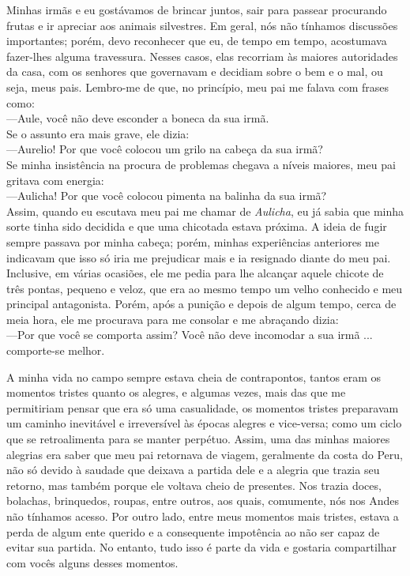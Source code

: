 Minhas irmãs e eu gostávamos de brincar juntos, sair para passear procurando frutas e ir apreciar aos animais silvestres. Em geral, nós não tínhamos discussões importantes; porém, devo reconhecer que eu, de tempo em tempo, acostumava fazer-lhes alguma travessura.
Nesses casos, elas recorriam às maiores autoridades da casa, com os senhores que governavam e decidiam sobre o bem e o mal, ou seja, meus pais. 
Lembro-me de que, no princípio, meu pai me falava com frases como:\\\indent
---Aule, você não deve esconder a boneca da sua irmã.\\\indent
Se o assunto era mais grave, ele dizia: \\\indent
---Aurelio! Por que você colocou um grilo na cabeça da sua irmã?\\\indent
Se minha insistência na procura de problemas chegava a níveis maiores, meu pai gritava com energia:\\\indent
---Aulicha! Por que você colocou pimenta na balinha da sua irmã?\\\indent
Assim, quando eu escutava meu pai me chamar de \textit{Aulicha}, eu já sabia que minha sorte tinha sido decidida e que uma chicotada estava próxima. A ideia de fugir sempre passava por minha cabeça; porém, minhas experiências anteriores me indicavam que isso só iria me prejudicar mais e ia resignado diante do meu pai. Inclusive, em várias ocasiões, ele me pedia para lhe alcançar aquele chicote de três pontas, pequeno e veloz, que era ao mesmo tempo um velho conhecido e meu principal antagonista.
Porém, após a punição e depois de algum tempo, cerca de meia hora,
ele me procurava para me consolar e me abraçando dizia:\\\indent
---Por que você se comporta assim? Você não deve incomodar a sua irmã ... comporte-se melhor.


A minha vida no campo sempre estava cheia de contrapontos, tantos eram os momentos tristes quanto os alegres, e algumas vezes, mais das que me permitiriam pensar que era só uma casualidade, os momentos tristes preparavam um caminho inevitável e irreversível às épocas alegres e vice-versa; como um ciclo que se retroalimenta para se manter perpétuo. 
Assim, uma das minhas maiores alegrias era saber que meu pai retornava de viagem, geralmente da costa do Peru, não só devido à saudade que deixava a partida dele e a alegria que trazia seu retorno, mas também porque ele voltava cheio de presentes. 
Nos trazia doces, bolachas, brinquedos, roupas, entre outros, aos quais, comumente, nós nos Andes não tínhamos acesso.
Por outro lado, entre meus momentos mais tristes, estava a perda de algum ente querido e a consequente impotência ao não ser capaz de evitar sua partida. 
No entanto, tudo isso é parte da vida e gostaria compartilhar com vocês alguns desses momentos.



